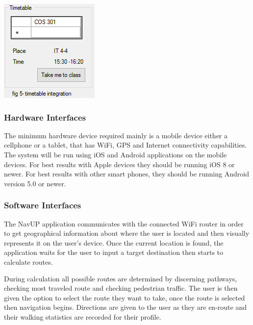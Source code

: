 \documentclass[a4paper,12pt]{article}
\begin{document}
\includegraphics[width=\textwidth]{images/user_five.PNG}

\subsubsection{Hardware Interfaces}
The minimum hardware device required mainly is a mobile device either a cellphone or a tablet, that has WiFi, GPS and Internet connectivity capabilities. The system will be run using iOS and Android applications on the mobile devices. For best results with Apple devices they should be running iOS 8 or newer. For best results with other smart phones, they should be running Android version 5.0 or newer. 
\subsubsection{Software Interfaces}
The NavUP application communicates with the connected WiFi router in order to get geographical information about where the user is located and then visually represents it on the user's device. Once the current location is found, the application waits for the user to input a target destination then starts to calculate routes. 

During calculation all possible routes are determined by discerning pathways, checking most traveled route and checking pedestrian traffic. The user is then given the option to select the route they want to take, once the route is selected then navigation begins. Directions are given to the user as they are en-route and their walking statistics are recorded for their profile.
\end{document}
